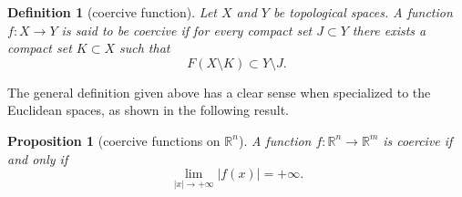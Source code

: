 \documentclass[12pt]{article}
\newcommand{\R}{\mathbb R}
\newtheorem{proposition}{Proposition}
\newtheorem{definition}{Definition}
\theoremstyle{remark}
\begin{document}
\begin{definition}[coercive function]
Let $X$ and $Y$ be topological spaces.
A function $f\colon X\to Y$ is said to be \emph{coercive} if for every compact set $J\subset Y$ there exists a compact set $K\subset X$ such that
\[
  F(X\setminus K) \subset Y\setminus J.
\]
\end{definition}

The general definition given above has a clear sense when specialized to the Euclidean spaces, as shown in the following result.

\begin{proposition}[coercive functions on $\R^n$]
A function $f\colon \R^n \to \R^m$ is coercive if and only if 
\[
  \lim_{|x|\to +\infty} |f(x)| = +\infty.
\]
\end{proposition}
\end{document}
